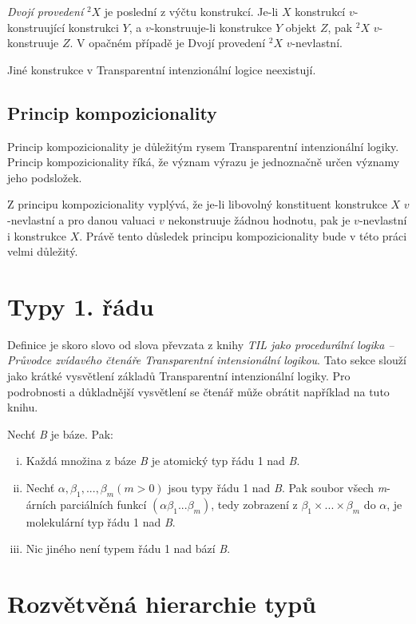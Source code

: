 \textit{Dvojí provedení} ${}^2X$ je poslední z výčtu konstrukcí. Je-li $X$ konstrukcí
$v$-konstruující konstrukci $Y$, a $v$-konstruuje-li konstrukce $Y$ objekt $Z$, pak ${}^2X$
$v$-konstruuje $Z$. V opačném případě je Dvojí provedení ${}^2X$ $v$-nevlastní.

Jiné konstrukce v Transparentní intenzionální logice neexistují.

\subsection{Princip kompozicionality} 

Princip kompozicionality je důležitým rysem Transparentní intenzionální logiky.
Princip kompozicionality říká, že význam výrazu je jednoznačně určen významy jeho podsložek.

Z principu kompozicionality vyplývá, že je-li libovolný konstituent konstrukce $X$ $v$-nevlastní
a pro danou valuaci $v$ nekonstruuje žádnou hodnotu, pak je $v$-nevlastní i konstrukce $X$. Právě
tento důsledek principu kompozicionality bude v této práci velmi důležitý.

\section{Typy 1. řádu}\label{fst-order}

Definice je skoro slovo od slova převzata z knihy
\textit{TIL jako procedurální logika -- Průvodce zvídavého čtenáře Transparentní intensionální
  logikou}\cite{til-duzi}. Tato sekce slouží jako krátké vysvětlení základů Transparentní
intenzionální logiky. Pro podrobnosti a důkladnější vysvětlení se čtenář může obrátit například
na tuto knihu.

Nechť \textit{B} je báze. Pak:

\begin{enumerate}[i)]
    \item Každá množina z báze \textit{B} je atomický typ řádu 1 nad \textit{B}.
    \item Nechť $\alpha, \beta_1, ...,\beta_m (m > 0)$ jsou typy řádu 1 nad \textit{B}. Pak soubor
        všech \textit{m}-árních parciálních funkcí $(\alpha\beta_1...\beta_m)$, tedy zobrazení z 
        $\beta_1 \times ... \times \beta_m$ do $\alpha$, je molekulární typ řádu 1 nad \textit{B}.
    \item Nic jiného není typem řádu 1 nad bází \textit{B}.
\end{enumerate}

\section{Rozvětvěná hierarchie typů}\label{type-order}

